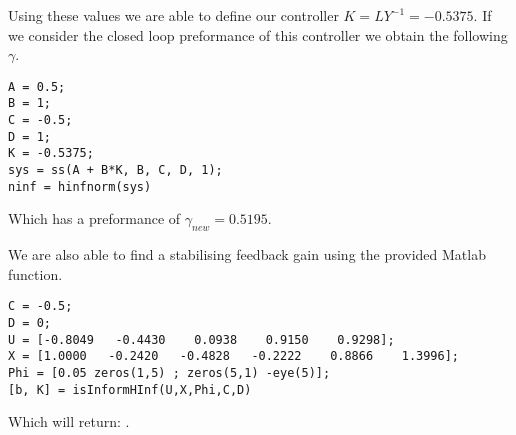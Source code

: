 Using these values we are able to define our controller $K = LY^{-1} = -0.5375$. If we consider the closed loop preformance of this controller we obtain the following $\gamma$.

\begin{lstlisting}
A = 0.5;
B = 1;
C = -0.5;
D = 1;
K = -0.5375;
sys = ss(A + B*K, B, C, D, 1);
ninf = hinfnorm(sys)
\end{lstlisting}
Which has a preformance of $\gamma_{new} = 0.5195$. 

We are also able to find a stabilising feedback gain using the provided Matlab function.
\begin{lstlisting}
C = -0.5;
D = 0;
U = [-0.8049   -0.4430    0.0938    0.9150    0.9298];
X = [1.0000   -0.2420   -0.4828   -0.2222    0.8866    1.3996];
Phi = [0.05 zeros(1,5) ; zeros(5,1) -eye(5)];
[b, K] = isInformHInf(U,X,Phi,C,D)
\end{lstlisting}
Which will return: \mon{[ 1, -0.5375 ]}.

























